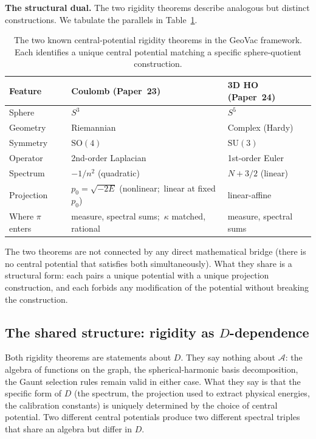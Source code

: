 \documentclass[twocolumn,pra,amsmath,amssymb,superscriptaddress]{revtex4-2}
\begin{document}
\medskip\noindent\textbf{The structural dual.}  The two rigidity
theorems describe analogous but distinct constructions.  We tabulate
the parallels in Table~\ref{tab:rigidity_dual}.

\begin{table}[h]
\caption{The two known central-potential rigidity theorems in the
GeoVac framework.  Each identifies a unique central potential
matching a specific sphere-quotient construction.}
\label{tab:rigidity_dual}
\begin{ruledtabular}
\begin{tabular}{lll}
Feature & Coulomb (Paper~23) & 3D HO (Paper~24) \\
\hline
Sphere & $S^3$ & $S^5$ \\
Geometry & Riemannian & Complex (Hardy) \\
Symmetry & $\mathrm{SO}(4)$ & $\mathrm{SU}(3)$ \\
Operator & 2nd-order Laplacian & 1st-order Euler \\
Spectrum & $-1/n^2$ (quadratic) & $N + 3/2$ (linear) \\
Projection & $p_0 = \sqrt{-2E}$ (nonlinear;\ linear at fixed $p_0$) & linear-affine \\
Where $\pi$ enters & measure, spectral sums;\ $\kappa$ matched, rational & measure, spectral sums \\
\end{tabular}
\end{ruledtabular}
\end{table}

The two theorems are not connected by any direct mathematical bridge
(there is no central potential that satisfies both simultaneously).
What they share is a structural form: each pairs a unique potential
with a unique projection construction, and each forbids any
modification of the potential without breaking the construction.

\subsection{The shared structure: rigidity as $D$-dependence}

Both rigidity theorems are statements about $D$.  They say nothing
about $\mathcal{A}$: the algebra of functions on the graph, the
spherical-harmonic basis decomposition, the Gaunt selection rules
remain valid in either case.  What they say is that the specific form
of $D$ (the spectrum, the projection used to extract physical
energies, the calibration constants) is uniquely determined by the
choice of central potential.  Two different central potentials
produce two different spectral triples that share an algebra but
differ in $D$.
\end{document}
